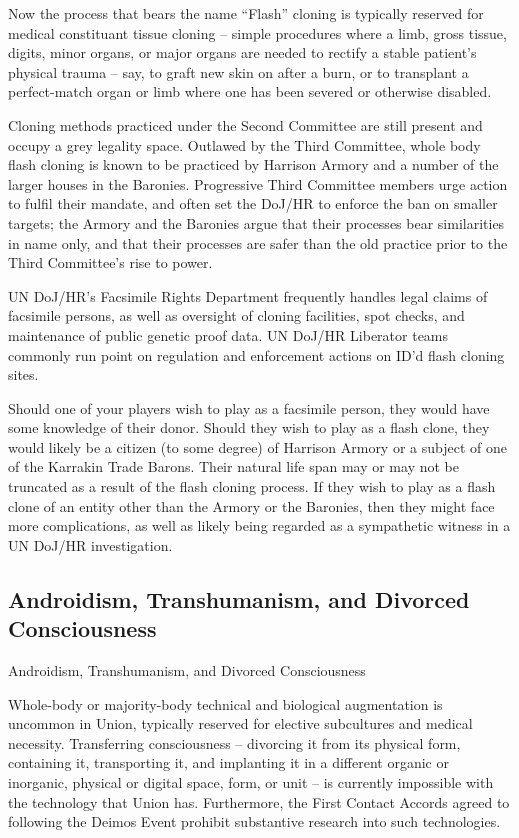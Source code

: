 Now the process that bears the name “Flash” cloning is typically reserved for medical
constituant tissue cloning -- simple procedures where a limb, gross tissue, digits, minor organs,
or major organs are needed to rectify a stable patient’s physical trauma -- say, to graft new skin
on after a burn, or to transplant a perfect-match organ or limb where one has been severed or
otherwise disabled.


Cloning methods practiced under the Second Committee are still present and occupy a grey
legality space. Outlawed by the Third Committee, whole body flash cloning is known to be
practiced by Harrison Armory and a number of the larger houses in the Baronies. Progressive
Third Committee members urge action to fulfil their mandate, and often set the DoJ/HR to
enforce the ban on smaller targets; the Armory and the Baronies argue that their processes bear
similarities in name only, and that their processes are safer than the old practice prior to the Third
Committee’s rise to power.


UN DoJ/HR’s Facsimile Rights Department frequently handles legal claims of facsimile persons,
as well as oversight of cloning facilities, spot checks, and maintenance of public genetic proof
data. UN DoJ/HR Liberator teams commonly run point on regulation and enforcement actions on
ID’d flash cloning sites.





Should one of your players wish to play as a facsimile person, they would have some knowledge
of their donor. Should they wish to play as a flash clone, they would likely be a citizen (to some
degree) of Harrison Armory or a subject of one of the Karrakin Trade Barons. Their natural life
span may or may not be truncated as a result of the flash cloning process. If they wish to play as
a flash clone of an entity other than the Armory or the Baronies, then they might face more
complications, as well as likely being regarded as a sympathetic witness in a UN DoJ/HR
investigation.

\subsection{Androidism, Transhumanism, and Divorced Consciousness}
Androidism, Transhumanism, and Divorced Consciousness

Whole-body or majority-body technical and biological augmentation is uncommon in Union,
typically reserved for elective subcultures and medical necessity. Transferring consciousness --
divorcing it from its physical form, containing it, transporting it, and implanting it in a different
organic or inorganic, physical or digital space, form, or unit -- is currently impossible with the
technology that Union has. Furthermore, the First Contact Accords agreed to following the
Deimos Event prohibit substantive research into such technologies.


